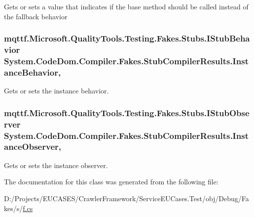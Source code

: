 Gets or sets a value that indicates if the base method should be called instead of the fallback behavior

\hypertarget{class_system_1_1_code_dom_1_1_compiler_1_1_fakes_1_1_stub_compiler_results_a648b8b5069246fc80c2c4a2948f5c270}{
\subsubsection[{Instance\-Behavior}]{\setlength{\rightskip}{0pt plus 5cm}mqttf.\-Microsoft.\-Quality\-Tools.\-Testing.\-Fakes.\-Stubs.\-I\-Stub\-Behavior System.\-Code\-Dom.\-Compiler.\-Fakes.\-Stub\-Compiler\-Results.\-Instance\-Behavior\hspace{0.3cm}{\ttfamily [get]}, {\ttfamily [set]}}}\label{class_system_1_1_code_dom_1_1_compiler_1_1_fakes_1_1_stub_compiler_results_a648b8b5069246fc80c2c4a2948f5c270}


Gets or sets the instance behavior.

\hypertarget{class_system_1_1_code_dom_1_1_compiler_1_1_fakes_1_1_stub_compiler_results_a9ed8b96dc9893baeaad46d77691d1517}{
\subsubsection[{Instance\-Observer}]{\setlength{\rightskip}{0pt plus 5cm}mqttf.\-Microsoft.\-Quality\-Tools.\-Testing.\-Fakes.\-Stubs.\-I\-Stub\-Observer System.\-Code\-Dom.\-Compiler.\-Fakes.\-Stub\-Compiler\-Results.\-Instance\-Observer\hspace{0.3cm}{\ttfamily [get]}, {\ttfamily [set]}}}\label{class_system_1_1_code_dom_1_1_compiler_1_1_fakes_1_1_stub_compiler_results_a9ed8b96dc9893baeaad46d77691d1517}


Gets or sets the instance observer.



The documentation for this class was generated from the following file\-:\begin{DoxyCompactItemize}
\item 
D\-:/\-Projects/\-E\-U\-C\-A\-S\-E\-S/\-Crawler\-Framework/\-Service\-E\-U\-Cases.\-Test/obj/\-Debug/\-Fakes/s/\hyperlink{s_2f_8cs}{f.\-cs}\end{DoxyCompactItemize}
